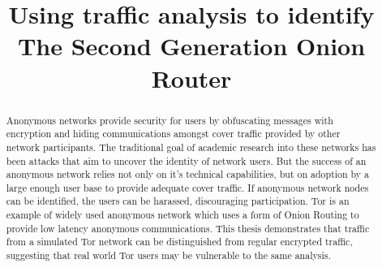 \documentclass[conference]{IEEEtran}
\begin{document}
\title{Using traffic analysis to identify The Second Generation Onion Router}

\author{
  \and
  \and
}

\maketitle

\begin{abstract}
Anonymous networks provide security for users by obfuscating messages with
encryption and hiding communications amongst cover traffic provided by other
network participants. The traditional goal of academic research into these
networks has been attacks that aim to uncover the identity of network users.
But the success of an anonymous network relies not only on it's technical
capabilities, but on adoption by a large enough user base to provide adequate
cover traffic. If anonymous network nodes can be identified, the users
can be harassed, discouraging participation. Tor is an example of widely used
anonymous network which uses a form of Onion Routing to provide low latency
anonymous communications. This thesis demonstrates that traffic from a simulated
Tor network can be distinguished from regular encrypted traffic, suggesting that
real world Tor users may be vulnerable to the same analysis.
\end{abstract}
\end{document}
